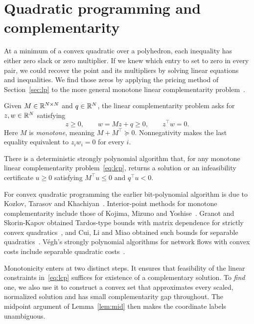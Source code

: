 \section{Quadratic programming and complementarity}\label{sec:quadratic}

At a minimum of a convex quadratic over a polyhedron, each inequality
has either zero slack or zero multiplier. If we knew which entry to set
to zero in every pair, we could recover the point and its multipliers
by solving linear equations and inequalities. We find those zeros by
applying the pricing method of Section~\ref{sec:lp} to the more general
monotone linear complementarity problem~\cite{CD,CPS}.

Given \(M\in\mathbb R^{N\times N}\) and \(q\in\mathbb R^N\), the linear
complementarity problem asks for \(z,w\in\mathbb R^N\) satisfying
\begin{equation}\label{eq:lcp}
 z\ge0,\qquad w=Mz+q\ge0,\qquad z^\top w=0 .
\end{equation}
Here \(M\) is \emph{monotone}, meaning \(M+M^\top\succeq0\).
Nonnegativity makes the last equality equivalent to \(z_iw_i=0\)
for every \(i\).

\begin{theorem}\label{thm:lcp}
There is a deterministic strongly polynomial algorithm
that, for any monotone linear complementarity
problem~\eqref{eq:lcp},
returns a solution or an infeasibility certificate \(u\ge0\)
satisfying \(M^\top u\le0\) and \(q^\top u<0\).
\end{theorem}

For convex quadratic programming the earlier bit-polynomial algorithm
is due to Kozlov, Tarasov and Khachiyan~\cite{KTK}. Interior-point
methods for monotone complementarity include those of Kojima, Mizuno
and Yoshise~\cite{KMY}. Granot and Skorin-Kapov obtained Tardos-type
bounds with matrix dependence for strictly convex quadratics~\cite{GSK},
and Cui, Li and Miao obtained such bounds for separable
quadratics~\cite{CLM}. V\'egh's strongly polynomial algorithms for
network flows with convex costs include separable quadratic costs~\cite{VQ}.

Monotonicity enters at two distinct steps. It ensures that feasibility
of the linear constraints in~\eqref{eq:lcp} suffices for existence of a
complementary solution. To \emph{find} one, we also use it to construct
a convex set that approximates every scaled, normalized solution
and has small complementarity gap throughout. The midpoint argument of
Lemma~\ref{lem:mid} then makes the coordinate labels unambiguous.

